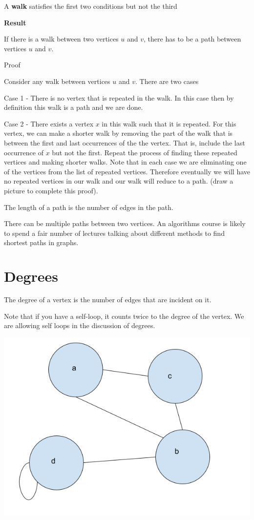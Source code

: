 \documentclass[12pt]{article}
\begin{document}
A \textbf{walk} satisfies the first two conditions but not the third

\medskip

\textbf{Result}

If there is a walk between two vertices $u$ and $v$, there has to be a path between vertices $u$ and $v$.

Proof

Consider any walk between vertices $u$ and $v$. There are two cases

Case 1 - There is no vertex that is repeated in the walk. In this case then by definition this walk is a path and we are done.

Case 2 - There exists a vertex $x$ in this walk such that it is repeated. For this vertex, we can make a shorter walk by removing the part of the walk that is between the first and last occurrences of the the vertex. That is, include the last occurrence of $x$ but not the first. Repeat the process of finding these repeated vertices and making shorter walks. Note that in each case we are eliminating one of the vertices from the list of repeated vertices. Therefore eventually we will have no repeated vertices in our walk and our walk will reduce to a path. (draw a picture to complete this proof).

\medskip

The length of a path is the number of edges in the path.

There can be multiple paths between two vertices. An algorithms course is likely to spend a fair number of lectures talking about different methods to find shortest paths in graphs.

\section*{Degrees}

The degree of a vertex is the number of edges that are incident on it. 

Note that if you have a self-loop, it counts twice to the degree of the vertex. We are allowing self loops in the discussion of degrees.

\includegraphics[scale=0.5]{graph2.png}
\end{document}
